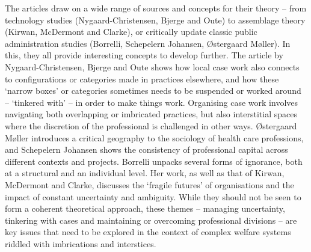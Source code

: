 \par
The articles draw on a wide range of sources and concepts for their theory – from technology studies (Nygaard-Christensen, Bjerge and Oute) to assemblage theory (Kirwan, McDermont and Clarke), or critically update classic public administration studies (Borrelli, Schepelern Johansen, Østergaard Møller). In this, they all provide interesting concepts to develop further. The article by Nygaard-Christensen, Bjerge and Oute shows how local case work also connects to configurations or categories made in practices elsewhere, and how these ‘narrow boxes’ or categories sometimes needs to be suspended or worked around – ‘tinkered with’ – in order to make things work. Organising case work involves navigating both overlapping or imbricated practices, but also interstitial spaces where the discretion of the professional is challenged in other ways. Østergaard Møller introduces a critical geography to the sociology of health care professions, and Schepelern Johansen shows the consistency of professional capital across different contexts and projects. Borrelli unpacks several forms of ignorance, both at a structural and an individual level. Her work, as well as that of Kirwan, McDermont and Clarke, discusses the ‘fragile futures’ of organisations and the impact of constant uncertainty and ambiguity. While they should not be seen to form a coherent theoretical approach, these themes – managing uncertainty, tinkering with cases and maintaining or overcoming professional divisions – are key issues that need to be explored in the context of complex welfare systems riddled with imbrications and interstices.
\par
